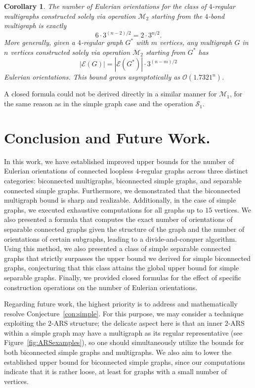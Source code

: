 \documentclass{article}
\newtheorem{corollary}{Corollary}
\begin{document}
        \begin{corollary}
            The number of Eulerian orientations for the class of $4$-regular multigraphs constructed solely via operation $\mathcal{M}_2$ starting from the $4$-bond multigraph is exactly
            $$ 6\cdot 3^{(n-2)/2} = 2 \cdot 3^{n/2}. $$
            More generally, given a $4$-regular graph $G^*$ with $m$ vertices, any multigraph $G$ in $n$ vertices constructed solely via operation $\mathcal{M}_2$ starting from $G^*$ has 
            $$ |\mathcal{E}(G)| = |\mathcal{E}(G^*)| \cdot 3^{(n-m)/2} $$
            Eulerian orientations.
            This bound grows asymptotically as $\mathcal{O} \left(1.7321^n \right)$.
        \end{corollary}
        
        A closed formula could not be derived directly in a similar manner for $\mathcal{M}_1$, for the same reason as in the simple graph case and the operation $\mathcal{S}_1$.
    

    \section{Conclusion and Future Work.}\label{sec:concl}

        In this work, we have established improved upper bounds for the number of Eulerian orientations of connected loopless $4$-regular graphs across three distinct categories: biconnected multigraphs, biconnected simple graphs, and separable connected simple graphs.
        Furthermore, we demonstrated that the biconnected multigraph bound is sharp and realizable.
        Additionally, in the case of simple graphs, we executed exhaustive computations for all graphs up to $15$ vertices.
        We also presented a formula that computes the exact number of orientations of separable connected graphs given the structure of the graph and the number of orientations of certain subgraphs, leading to a divide-and-conquer algorithm.
        Using this method, we also presented a class of simple separable connected graphs that strictly surpasses the upper bound we derived for simple biconnected graphs, conjecturing that this class attains the global upper bound for simple separable graphs.
        Finally, we provided closed formulas for the effect of specific construction operations on the number of Eulerian orientations.


        Regarding future work, the highest priority is to address and mathematically resolve Conjecture~\ref{con:simple}.
        For this purpose, we may consider a technique exploiting the $2$-ARS structure; the delicate aspect here is that an inner $2$-ARS within a simple graph may have a multigraph as its regular representative (see Figure~\ref{fig:ARSexamples}), so one should simultaneously utilize the bounds for both biconnected simple graphs and multigraphs.
        We also aim to lower the established upper bound for biconnected simple graphs, since our computations indicate that it is rather loose, at least for graphs with a small number of vertices.
        
\end{document}
